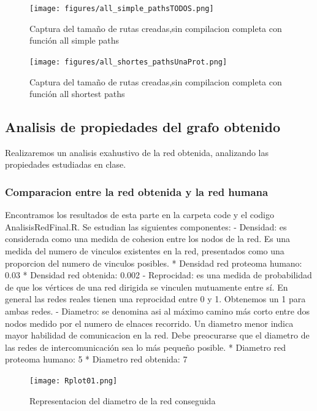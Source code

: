 \begin{figure}[ht!]
	\centering
	\texttt{[image: figures/all\_simple\_pathsTODOS.png]}
	\caption{Captura del tamaño de rutas creadas,sin compilacion completa con función all simple paths}
\end{figure}

\begin{figure}[ht!]
	\centering
	\texttt{[image: figures/all\_shortes\_pathsUnaProt.png]}
	\caption{Captura del tamaño de rutas creadas,sin compilacion completa con función all shortest paths}
\end{figure}



\subsection{Analisis de propiedades del grafo obtenido}
Realizaremos un analisis exahustivo de la red obtenida, analizando las propiedades estudiadas en clase.

\subsubsection{Comparacion entre la red obtenida y la red humana}
Encontramos los resultados de esta parte en la carpeta code y el codigo AnalisisRedFinal.R. Se estudian las siguientes componentes:
- Densidad: es considerada como una medida de cohesion entre los nodos de la red. Es una medida del numero de vinculos existentes en la red, presentados como una proporcion del numero de vinculos posibles. 
  * Densidad red proteoma humano: 0.03
  * Densidad red obtenida: 0.002
- Reprocidad: es una medida de probabilidad de que los vértices de una red dirigida se vinculen mutuamente entre sí. En general las redes reales tienen una reprocidad entre 0 y 1. Obtenemos un 1 para ambas redes.
- Diametro: se denomina asi al máximo camino más corto entre dos nodos medido por el numero de elnaces recorrido. Un diametro menor indica mayor habilidad de comunicacion en la red. Debe preocurarse que el diametro de las redes de intercomunicación sea lo más pequeño posible. 
  * Diametro red proteoma humano: 5
  * Diametro red obtenida: 7
  
  \begin{figure}[ht!]
	\centering
	\texttt{[image: Rplot01.png]}
	\caption{Representacion del diametro de la red conseguida}
\end{figure}


